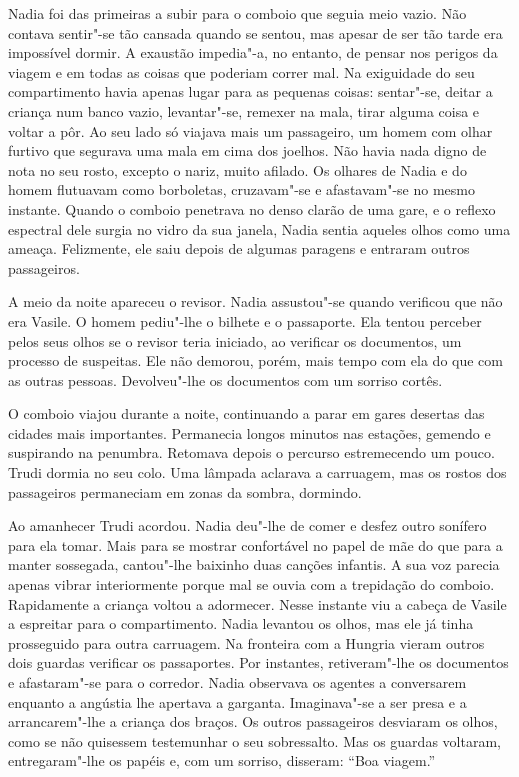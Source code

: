 Nadia foi das primeiras a subir para o comboio que
seguia meio vazio. Não contava sentir"-se tão cansada quando se sentou,
mas apesar de ser tão tarde era impossível dormir. A exaustão
impedia"-a, no entanto, de pensar nos perigos da viagem e em todas as
coisas que poderiam correr mal. Na exiguidade do seu compartimento havia
apenas lugar para as pequenas coisas: sentar"-se, deitar a criança num
banco vazio, levantar"-se, remexer na mala, tirar alguma coisa e voltar a
pôr. Ao seu lado só viajava mais um passageiro, um homem com olhar
furtivo que
segurava uma mala em cima dos joelhos. Não havia nada digno de nota no
seu rosto, excepto o nariz, muito afilado. Os olhares de Nadia e do
homem flutuavam como borboletas, cruzavam"-se e afastavam"-se no mesmo
instante. Quando o comboio penetrava no denso clarão de uma gare, e o
reflexo espectral dele surgia no vidro da sua janela, Nadia sentia
aqueles olhos como uma ameaça. Felizmente, ele saiu depois de algumas
paragens e entraram outros passageiros.

A meio da noite apareceu o revisor. Nadia assustou"-se quando verificou
que não era Vasile. O homem pediu"-lhe o bilhete e o passaporte. Ela
tentou perceber pelos seus olhos se o revisor teria iniciado, ao
verificar os documentos, um processo de suspeitas. Ele não demorou,
porém, mais tempo com ela do que com as outras pessoas. Devolveu"-lhe os
documentos com um sorriso cortês.

O comboio viajou durante a noite, continuando a parar em gares desertas
das cidades mais importantes. Permanecia longos minutos nas estações,
gemendo e suspirando na penumbra. Retomava depois o percurso
estremecendo um pouco. Trudi dormia no seu colo. Uma lâmpada aclarava a
carruagem, mas os rostos dos passageiros permaneciam em zonas da sombra,
dormindo.

Ao amanhecer Trudi acordou. Nadia deu"-lhe de comer e desfez outro
sonífero para ela tomar. Mais para se mostrar confortável no papel de
mãe do que para a manter sossegada, cantou"-lhe baixinho duas canções
infantis. A sua voz parecia apenas vibrar interiormente porque mal se
ouvia com a trepidação do comboio. Rapidamente a criança voltou a
adormecer. Nesse instante viu a cabeça de
Vasile a espreitar para o compartimento. Nadia levantou os olhos, mas
ele já tinha prosseguido para outra carruagem. Na fronteira com a
Hungria vieram outros dois guardas verificar os passaportes. Por
instantes, retiveram"-lhe os documentos e afastaram"-se para o corredor.
Nadia observava os agentes a conversarem enquanto a angústia lhe
apertava a garganta. Imaginava"-se a ser presa e a arrancarem"-lhe a
criança dos braços. Os outros passageiros desviaram os olhos, como se
não quisessem testemunhar o seu sobressalto. Mas os guardas voltaram,
entregaram"-lhe os
papéis e, com um sorriso, disseram: ``Boa viagem.''

